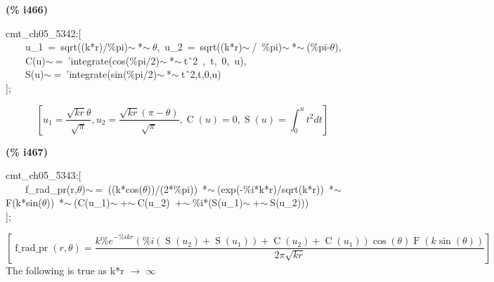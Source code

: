 \documentclass[fleqn]{article}
\begin{document}
\noindent
\begin{minipage}[t]{4.000000em}\color{red}\bfseries
(\% i466)	
\end{minipage}
\begin{minipage}[t]{\textwidth}\color{blue}
cmt\_ch05\_5342:[\\
\ \ \ \ u\_1\ =\ sqrt((k*r)/\%pi)\ensuremath{\sim\ }*\ensuremath{\sim\ }\ensuremath{\theta},\ u\_2\ =\ sqrt((k*r)\ensuremath{\sim\ }/\ \%pi)\ensuremath{\sim\ }*\ensuremath{\sim\ }(\%pi-\ensuremath{\theta}),\\
\ \ \ \ C(u)\ensuremath{\sim\ }=\ 'integrate(cos(\%pi/2)\ensuremath{\sim\ }*\ensuremath{\sim\ }t\^\ 2\ ,\ t,\ 0,\ u),\\
\ \ \ \ S(u)\ensuremath{\sim\ }=\ 'integrate(sin(\%pi/2)\ensuremath{\sim\ }*\ensuremath{\sim\ }t\^\ 2,t,0,u)\\
];
\end{minipage}
\[\displaystyle \tag{\% o466} 
\left[ {u_1}=\frac{\sqrt{k r} \theta }{\sqrt{\ensuremath{\pi} }}\operatorname{,}{u_2}=\frac{\sqrt{k r} \left( \ensuremath{\pi} -\theta \right) }{\sqrt{\ensuremath{\pi} }}\operatorname{,}\operatorname{C}(u)=0\operatorname{,}\operatorname{S}(u)=\int_{0}^{u}{\left. {{t}^{2}}dt\right.}\right] \mbox{}
\]


\noindent
\begin{minipage}[t]{4.000000em}\color{red}\bfseries
(\% i467)	
\end{minipage}
\begin{minipage}[t]{\textwidth}\color{blue}
cmt\_ch05\_5343:[\\
\ \ \ \ f\_rad\_pr(r,\ensuremath{\theta})\ensuremath{\sim\ }=\ ((k*cos(\ensuremath{\theta}))/(2*\%pi))\ *\ensuremath{\sim\ }(exp(-\%i*k*r)/sqrt(k*r))\ *\ensuremath{\sim\ }F(k*sin(\ensuremath{\theta}))\ *\ensuremath{\sim\ }(C(u\_1)\ensuremath{\sim\ }+\ensuremath{\sim\ }C(u\_2)\ +\ensuremath{\sim\ }\%i*(S(u\_1)\ensuremath{\sim\ }+\ensuremath{\sim\ }S(u\_2)))\\
];
\end{minipage}
\[\displaystyle \tag{\% o467} 
\operatorname{[}\operatorname{f\_ rad\_ pr}\left( r\operatorname{,}\theta \right) =\frac{k {{\% e}^{-\% i k r}} \left( \% i \left( \operatorname{S}\left( {u_2}\right) +\operatorname{S}\left( {u_1}\right) \right) +\operatorname{C}\left( {u_2}\right) +\operatorname{C}\left( {u_1}\right) \right)  \cos{\left( \theta \right) } \operatorname{F}\left( k \sin{\left( \theta \right) }\right) }{2 \ensuremath{\pi}  \sqrt{k r}}\operatorname{]}\mbox{}
\]
The following is true as k*r \ensuremath{\longrightarrow} \ensuremath{\infty}
\end{document}
